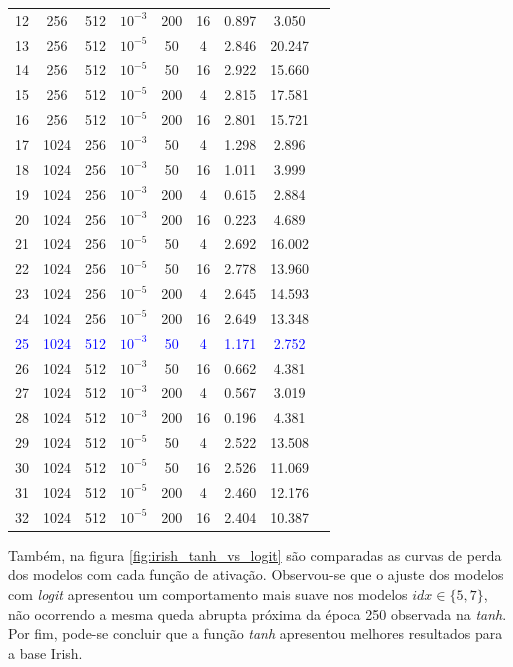 \documentclass{automatextcc}
\newcommand{\blue}[1]{\textcolor{blue}{#1}}
\begin{document}
\begin{table}[H]
{\begin{tabular}[t]{ccccccccc}
        12 & 256 & 512 & $10^{-3}$ & 200 & 16 & 0.897 & 3.050 \\
        13 & 256 & 512 & $10^{-5}$ & 50 & 4 & 2.846 & 20.247 \\
        14 & 256 & 512 & $10^{-5}$ & 50 & 16 & 2.922 & 15.660 \\
        15 & 256 & 512 & $10^{-5}$ & 200 & 4 & 2.815 & 17.581 \\
        16 & 256 & 512 & $10^{-5}$ & 200 & 16 & 2.801 & 15.721 \\
        17 & 1024 & 256 & $10^{-3}$ & 50 & 4 & 1.298 & 2.896 \\
        18 & 1024 & 256 & $10^{-3}$ & 50 & 16 & 1.011 & 3.999 \\
        19 & 1024 & 256 & $10^{-3}$ & 200 & 4 & 0.615 & 2.884 \\
        20 & 1024 & 256 & $10^{-3}$ & 200 & 16 & 0.223 & 4.689 \\
        21 & 1024 & 256 & $10^{-5}$ & 50 & 4 & 2.692 & 16.002 \\
        22 & 1024 & 256 & $10^{-5}$ & 50 & 16 & 2.778 & 13.960 \\
        23 & 1024 & 256 & $10^{-5}$ & 200 & 4 & 2.645 & 14.593 \\
        24 & 1024 & 256 & $10^{-5}$ & 200 & 16 & 2.649 & 13.348 \\
        
        \blue{25} & \blue{1024} & \blue{512} & \blue{$10^{-3}$} & \blue{50} & \blue{4} & \blue{1.171} & \blue{2.752} \\
        
        26 & 1024 & 512 & $10^{-3}$ & 50 & 16 & 0.662 & 4.381 \\
        27 & 1024 & 512 & $10^{-3}$ & 200 & 4 & 0.567 & 3.019 \\
        28 & 1024 & 512 & $10^{-3}$ & 200 & 16 & 0.196 & 4.381 \\
        29 & 1024 & 512 & $10^{-5}$ & 50 & 4 & 2.522 & 13.508 \\
        30 & 1024 & 512 & $10^{-5}$ & 50 & 16 & 2.526 & 11.069 \\
        31 & 1024 & 512 & $10^{-5}$ & 200 & 4 & 2.460 & 12.176 \\
        32 & 1024 & 512 & $10^{-5}$ & 200 & 16 & 2.404 & 10.387 \\
        \bottomrule
        \end{tabular}
    }
\end{table}

Também, na figura \ref{fig:irish_tanh_vs_logit} são comparadas as curvas de perda dos modelos com cada função de ativação. Observou-se que o ajuste dos modelos com \textit{logit} apresentou um comportamento mais suave nos modelos $idx \in \{5,7\}$, não ocorrendo a mesma queda abrupta próxima da época 250 observada na \textit{tanh}. Por fim, pode-se concluir que a função \textit{tanh} apresentou melhores resultados para a base Irish.  
\end{document}
